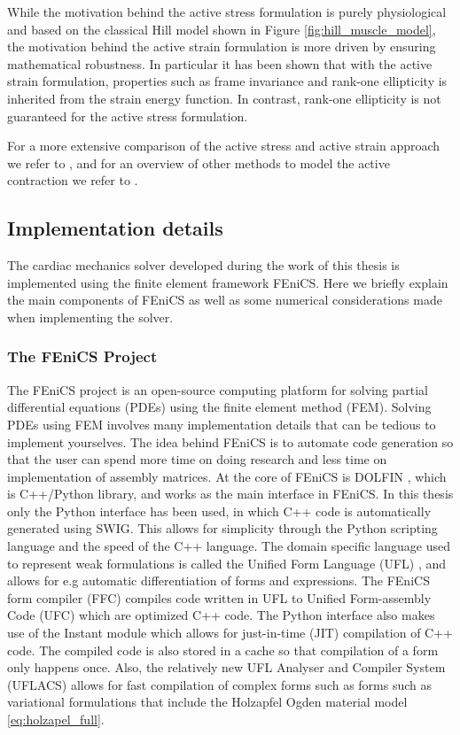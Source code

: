 While the motivation behind the active stress formulation is purely
physiological and based on the classical Hill model shown in Figure
\ref{fig:hill_muscle_model}, the motivation behind the active strain
formulation is more driven by ensuring mathematical robustness. In
particular it has been shown \cite{ambrosi2012active} that with the
active strain formulation, properties such as frame invariance and
rank-one ellipticity is inherited from the strain energy function. In
contrast, rank-one ellipticity is not guaranteed for the active stress
formulation.

For a more extensive comparison of the active stress and active strain
approach we refer to \cite{ambrosi2012active,giantesio2017comparison},
and for an overview of other methods to model the active contraction
we refer to \cite{goriely2017five}.



\subsection{Implementation details}
The cardiac mechanics solver developed during the work of this thesis
is implemented using the finite element framework FEniCS. Here we
briefly explain the main components of FEniCS as well as some
numerical considerations made when implementing the solver.


\subsubsection{The FEniCS Project}
\label{sec:fenics}

The FEniCS project is an open-source computing platform for solving
partial differential equations (PDEs) using the finite element method (FEM).
Solving PDEs using FEM involves many implementation details that can
be tedious to implement yourselves. The idea behind FEniCS is to
automate code generation so that the user can spend more time on doing
research and less time on implementation of assembly matrices. At the
core of FEniCS is DOLFIN \cite{logg2012dolfin}, which is C++/Python
library, and works as the main interface in FEniCS. In this thesis
only the Python interface has been used, in which C++ code is
automatically generated using SWIG. This allows for simplicity through
the Python scripting language and the speed of the C++ language.
The domain specific language used to represent weak formulations is
called the Unified Form Language (UFL) \cite{alnaes2014unified}, and
allows for e.g automatic differentiation of forms and expressions. The
FEniCS form compiler (FFC) \cite{logg2012ffc} compiles code written in
UFL to Unified Form-assembly Code (UFC) \cite{alnaes2012ufc} which are
optimized C++ code. The Python interface also makes use of the Instant
module which allows for just-in-time (JIT) compilation of C++
code. The compiled code is also stored in a cache so that compilation
of a form only happens once. Also, the relatively new UFL Analyser and
Compiler System (UFLACS) allows for fast compilation of complex forms
such as forms such as variational formulations that include the Holzapfel
Ogden material model \eqref{eq:holzapel_full}.

